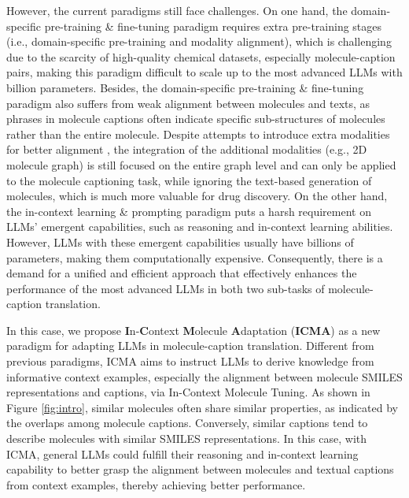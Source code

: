 However, the current paradigms still face challenges. On one hand, the domain-specific pre-training \& fine-tuning paradigm requires extra pre-training stages (i.e., domain-specific pre-training and modality alignment), which is challenging due to the scarcity of high-quality chemical datasets, especially molecule-caption pairs, making this paradigm difficult to scale up to the most advanced LLMs with billion parameters.
Besides, the domain-specific pre-training \& fine-tuning paradigm also suffers from weak alignment between molecules and texts, as phrases in molecule captions often indicate specific sub-structures of molecules rather than the entire molecule.
Despite attempts to introduce extra modalities for better alignment \cite{su2022molecular, liu2023molca}, the integration of the additional modalities (e.g., 2D molecule graph) is still focused on the entire graph level and can only be applied to the molecule captioning task, while ignoring the text-based generation of molecules, which is much more valuable for drug discovery.
On the other hand, the in-context learning \& prompting paradigm puts a harsh requirement on LLMs' emergent capabilities, such as reasoning and in-context learning abilities. However, LLMs with these emergent capabilities usually have billions of parameters, making them computationally expensive.
Consequently, there is a demand for a unified and efficient approach that effectively enhances the performance of the most advanced LLMs in both two sub-tasks of molecule-caption translation.

In this case, we propose \textbf{I}n-\textbf{C}ontext \textbf{M}olecule \textbf{A}daptation (\textbf{ICMA}) as a new paradigm for adapting LLMs in molecule-caption translation. 
Different from previous paradigms, ICMA aims to instruct LLMs to derive knowledge from informative context examples, especially the alignment between molecule SMILES representations and captions, via In-Context Molecule Tuning. As shown in Figure \ref{fig:intro}, similar molecules often share similar properties, as indicated by the overlaps among molecule captions. Conversely, similar captions tend to describe molecules with similar SMILES representations. In this case, with ICMA, general LLMs could fulfill their reasoning and in-context learning capability to better grasp the alignment between molecules and textual captions from context examples, thereby achieving better performance.

